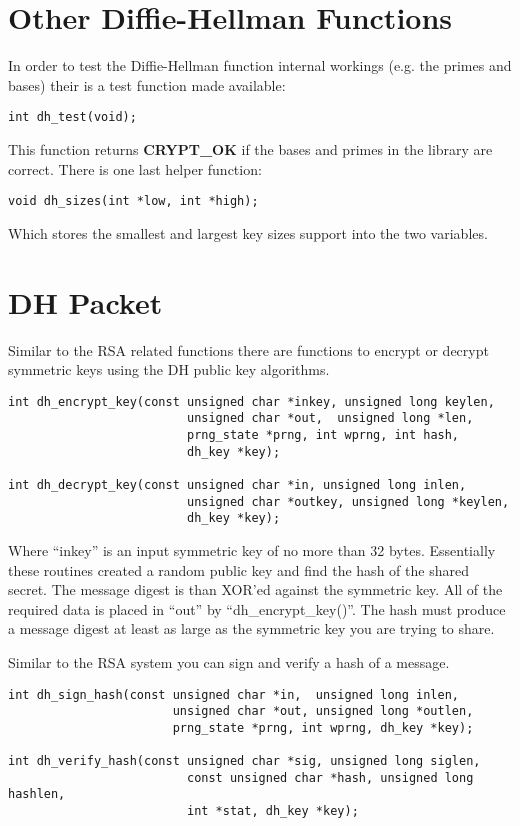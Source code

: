 \documentclass{book}
\begin{document}
\section{Other Diffie-Hellman Functions}
In order to test the Diffie-Hellman function internal workings (e.g. the primes and bases) their is a test function made
available:
\begin{verbatim}
int dh_test(void);
\end{verbatim}

This function returns {\bf CRYPT\_OK} if the bases and primes in the library are correct.  There is one last helper 
function:
\begin{verbatim}
void dh_sizes(int *low, int *high);
\end{verbatim}
Which stores the smallest and largest key sizes support into the two variables.

\section{DH Packet}
Similar to the RSA related functions there are functions to encrypt or decrypt symmetric keys using the DH public key
algorithms.  
\begin{verbatim}
int dh_encrypt_key(const unsigned char *inkey, unsigned long keylen,
                         unsigned char *out,  unsigned long *len, 
                         prng_state *prng, int wprng, int hash, 
                         dh_key *key);

int dh_decrypt_key(const unsigned char *in, unsigned long inlen,
                         unsigned char *outkey, unsigned long *keylen, 
                         dh_key *key);
\end{verbatim}
Where ``inkey'' is an input symmetric key of no more than 32 bytes.  Essentially these routines created a random public key
and find the hash of the shared secret.  The message digest is than XOR'ed against the symmetric key.  All of the 
required data is placed in ``out'' by ``dh\_encrypt\_key()''.   The hash must produce a message digest at least as large
as the symmetric key you are trying to share.

Similar to the RSA system you can sign and verify a hash of a message.
\begin{verbatim}
int dh_sign_hash(const unsigned char *in,  unsigned long inlen,
                       unsigned char *out, unsigned long *outlen,
                       prng_state *prng, int wprng, dh_key *key);

int dh_verify_hash(const unsigned char *sig, unsigned long siglen,
                         const unsigned char *hash, unsigned long hashlen, 
                         int *stat, dh_key *key);
\end{verbatim}
\end{document}
